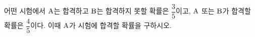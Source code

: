 어떤 시험에서 $\mathrm{A}$는 합격하고 $\mathrm{B}$는 합격하지 못할 확률은 $\dfrac{3}{5}$이고, $\mathrm{A}$ 또는 $\mathrm{B}$가 합격할 확률은 $\dfrac{4}{5}$이다. 이때 $\mathrm{A}$가 시험에 합격할 확률을 구하시오. 
